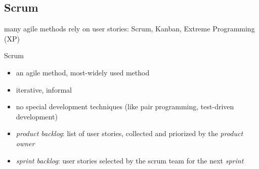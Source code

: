 \subsection{Scrum}
\begin{frame}{\insertsubsection}
	\begin{fancycolumns}[widths={45}]
		\begin{note}{}
				many agile methods rely on user stories: Scrum, Kanban, Extreme Programming (XP)
		\end{note}
		\nextcolumn
		\vspace{-10mm}
		\begin{definition}{Scrum \mysource{\sommerville}}
			\begin{itemize}
				\item an agile method, most-widely used method
				\item iterative, informal
				\item no special development techniques (like pair programming, test-driven development)
				\item \emph{product backlog}: list of user stories, collected and priorized by the \emph{product owner}
				\item \emph{sprint backlog}: user stories selected by the scrum team for the next \emph{sprint}
			\end{itemize}
		\end{definition}
		\begin{exampletight}{}
			\diagramScrum
		\end{exampletight}
	\end{fancycolumns}
\end{frame}

